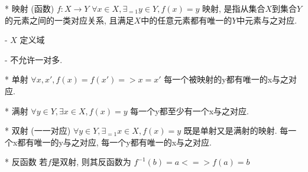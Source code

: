* 映射 (函数)
	\Define
		$f: X \to Y$
		$\forall x \in X, \exists_{= 1} y \in Y, f(x) = y$
		映射, 是指从集合$X$到集合$Y$的元素之间的一类对应关系, 且满足$X$中的任意元素都有唯一的$Y$中元素与之对应.

		- $X$ 定义域

		\Note
			- 不允许一对多.

	\Include
		* 单射
			\Define
				$\forall x, x', f(x) = f(x') => x = x'$
				每一个被映射的y都有唯一的x与之对应.

		* 满射
			\Define
				$\forall y \in Y, \exists x \in X, f(x) = y$
				每一个y都至少有一个x与之对应.

		* 双射 (一一对应)
			\Define
				$\forall y \in Y, \exists_{= 1} x \in X, f(x) = y$
				既是单射又是满射的映射.
				每一个x都有唯一的y与之对应, 每一个y都有唯一的x与之对应.

			\Property
				* 反函数
					\Define
						若$f$是双射, 则其反函数为
						$f^{-1}(b) = a <=> f(a) = b$
